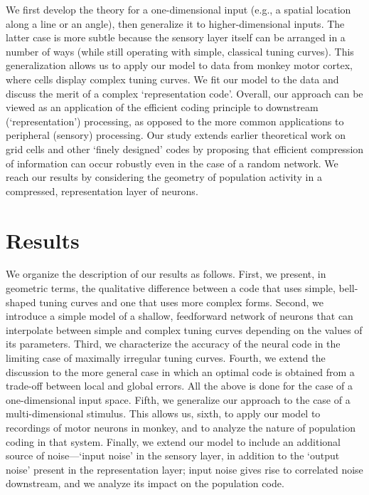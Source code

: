 \documentclass[a4paper]{article}%
\begin{document}
We first develop the theory for a one-dimensional input (e.g., a spatial
location along a line or an angle), then generalize it to higher-dimensional
inputs. The latter case is more subtle because the sensory layer itself can be
arranged in a number of ways (while still operating with simple, classical
tuning curves). This generalization allows us to apply our model to data from
monkey motor cortex, where cells display complex tuning curves. We fit our
model to the data and discuss the merit of a complex `representation code'.
Overall, our approach can be viewed as an application of the efficient coding
principle to downstream (`representation') processing, as opposed to the more
common applications to peripheral (sensory) processing. Our study extends
earlier theoretical work on grid cells and other `finely designed' codes by
proposing that efficient compression of information can occur robustly even in
the case of a random network. We reach our results by considering the geometry
of population activity in a compressed, representation layer of neurons.

\section{Results}

We organize the description of our results as follows. First, we present, in
geometric terms, the qualitative difference between a code that uses simple,
bell-shaped tuning curves and one that uses more complex forms. Second, we
introduce a simple model of a shallow, feedforward network of neurons that can
interpolate between simple and complex tuning curves depending on the values
of its parameters. Third, we characterize the accuracy of the neural code in
the limiting case of maximally irregular tuning curves. Fourth, we extend the
discussion to the more general case in which an optimal code is obtained from
a trade-off between local and global errors. All the above is done for the
case of a one-dimensional input space. Fifth, we generalize our approach to
the case of a multi-dimensional stimulus. This allows us, sixth, to apply our
model to recordings of motor neurons in monkey, and to analyze the nature of
population coding in that system. Finally, we extend our model to include an
additional source of noise---`input noise' in the sensory layer, in addition
to the `output noise' present in the representation layer; input noise gives
rise to correlated noise downstream, and we analyze its impact on the
population code.
\end{document}

